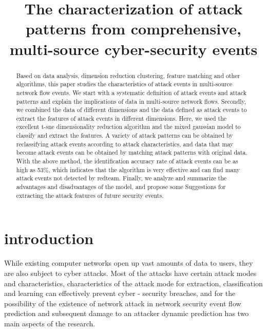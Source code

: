 \documentclass[12pt,journal,draftcls,doublespace, letterpaper,onecolumn]{IEEEtran}
\begin{document}
\title{The characterization of attack patterns from 
	comprehensive, multi-source cyber-security events\\
}

\author{
}


\maketitle

\begin{abstract}
	Based on data analysis, dimension reduction clustering, feature matching and other algorithms, this paper studies the characteristics of attack events in multi-source network flow events. We start with a systematic definition of attack events and attack patterns and explain the implications of data in multi-source network flows. Secondly, we combined the data of different dimensions and the data defined as attack events to extract the features of attack events in different dimensions. Here, we used the excellent t-sne dimensionality reduction algorithm and the mixed gaussian model to classify and extract the features. A variety of attack patterns can be obtained by reclassifying attack events according to attack characteristics, and data that may become attack events can be obtained by matching attack patterns with original data. With the above method, the identification accuracy rate of attack events can be as high as 53\%, which indicates that the algorithm is very effective and can find many attack events not detected by redteam. Finally, we analyze and summarize the advantages and disadvantages of the model, and propose some Suggestions for extracting the attack features of future security events.
\end{abstract}

\section{introduction}  \label{intro}
While existing computer networks open up vast amounts of data to users, they are also subject to cyber attacks. Most of the attacks have certain attack modes and characteristics, characteristics of the attack mode for extraction, classification and learning can effectively prevent cyber - security breaches, and for the possibility of the existence of network attack in network security event flow prediction and subsequent damage to an attacker dynamic prediction has two main aspects of the research.
\end{document}
